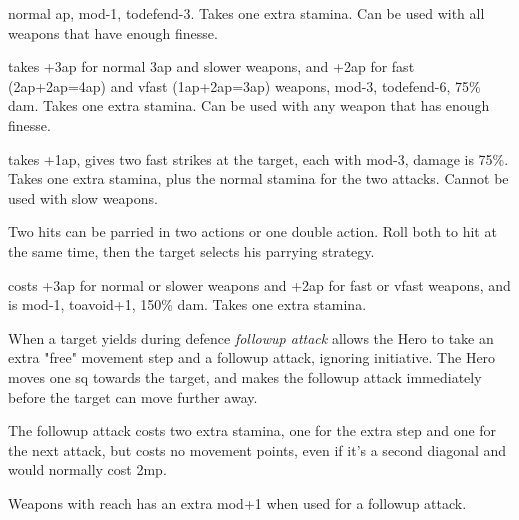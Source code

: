 

 normal ap, mod-1, todefend-3. Takes one extra stamina. Can be used with all weapons that have enough finesse.


 takes +3ap for normal 3ap and slower weapons, and +2ap for fast (2ap+2ap=4ap) and vfast (1ap+2ap=3ap) weapons, mod-3, todefend-6, 75\% dam. Takes one extra stamina. Can be used with any weapon that has enough finesse.


 takes +1ap, gives two fast strikes at the target, each with mod-3, damage is 75\%. Takes one extra stamina, plus the normal stamina for the two attacks. Cannot be used with slow weapons.

Two hits can be parried in two actions or one double action. Roll both to hit at the same time, then the target selects his parrying strategy.


 costs +3ap for normal or slower weapons and +2ap for fast or vfast weapons, and is mod-1, toavoid+1, 150\% dam. Takes one extra stamina.


 When a target yields during defence \emph{followup attack} allows the Hero to take an extra "free" movement step and a followup attack, ignoring initiative. The Hero moves one sq towards the target, and makes the followup attack immediately before the target can move further away.

The followup attack costs two extra stamina, one for the extra step and one for the next attack, but costs no movement points, even if it's a second diagonal and would normally cost 2mp.

Weapons with reach has an extra mod+1 when used for a followup attack.


